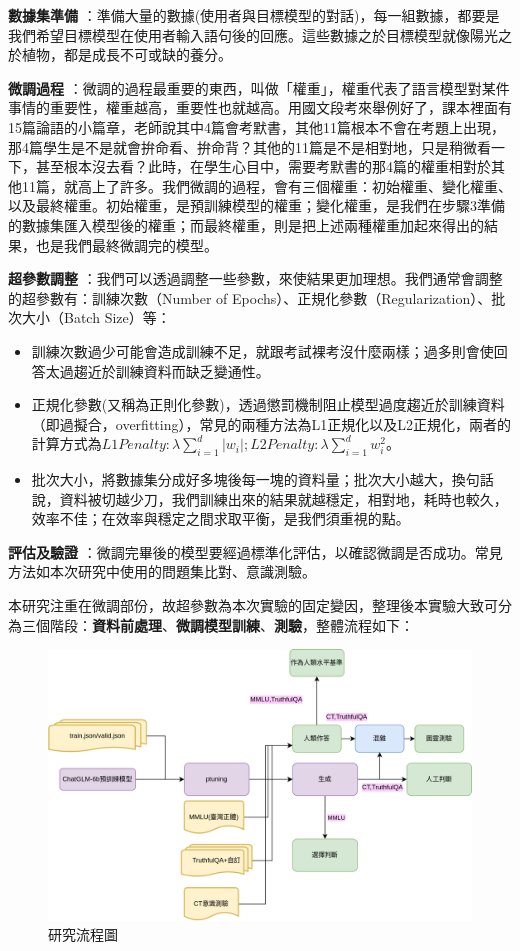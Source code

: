 \documentclass[12pt,a4paper,MingLiU,UTF8,natbib]{article}
\def\xeCJKembold{0.4}
\def\saveCJKnode{\dimen255\lastkern}
\def\restoreCJKnode{\kern-\dimen255\kern\dimen255}
\let\CJKoldsymbol\CJKsymbol
\let\CJKoldpunctsymbol\CJKpunctsymbol
\def\CJKfakeboldsymbol#1{%
	\special{pdf:literal direct 2 Tr \xeCJKembold\space w}%
	\CJKoldsymbol{#1}%
	\saveCJKnode
	\special{pdf:literal direct 0 Tr}%
	\restoreCJKnode}
\def\CJKfakeboldpunctsymbol#1{%
	\special{pdf:literal direct 2 Tr \xeCJKembold\space w}%
	\CJKoldpunctsymbol{#1}%
	\saveCJKnode
	\special{pdf:literal direct 0 Tr}%
	\restoreCJKnode}
\newcommand\CJKfakebold[1]{%
	\let\CJKsymbol\CJKfakeboldsymbol
	\let\CJKpunctsymbol\CJKfakeboldpunctsymbol
	#1%
	\let\CJKsymbol\CJKoldsymbol
	\let\CJKpunctsymbol\CJKoldpunctsymbol}
\begin{document}
	\CJKfakebold{\textbf{數據集準備}}：準備大量的數據(使用者與目標模型的對話)，每一組數據，都要是我們希望目標模型在使用者輸入語句後的回應。這些數據之於目標模型就像陽光之於植物，都是成長不可或缺的養分。
	
	\CJKfakebold{\textbf{微調過程}}：微調的過程最重要的東西，叫做「權重」，權重代表了語言模型對某件事情的重要性，權重越高，重要性也就越高。用國文段考來舉例好了，課本裡面有15篇論語的小篇章，老師說其中4篇會考默書，其他11篇根本不會在考題上出現，那4篇學生是不是就會拚命看、拚命背？其他的11篇是不是相對地，只是稍微看一下，甚至根本沒去看？此時，在學生心目中，需要考默書的那4篇的權重相對於其他11篇，就高上了許多。我們微調的過程，會有三個權重：初始權重、變化權重、以及最終權重。初始權重，是預訓練模型的權重；變化權重，是我們在步驟3準備的數據集匯入模型後的權重；而最終權重，則是把上述兩種權重加起來得出的結果，也是我們最終微調完的模型。
	
	\CJKfakebold{\textbf{超參數調整}}：我們可以透過調整一些參數，來使結果更加理想。我們通常會調整的超參數有：訓練次數（Number of Epochs）、正規化參數（Regularization）、批次大小（Batch Size）等：
	\begin{itemize}
		\item 訓練次數過少可能會造成訓練不足，就跟考試裸考沒什麼兩樣；過多則會使回答太過趨近於訓練資料而缺乏變通性。
		\item 正規化參數(又稱為正則化參數)，透過懲罰機制阻止模型過度趨近於訓練資料（即過擬合，overfitting），常見的兩種方法為L1正規化以及L2正規化，兩者的計算方式為$L1 Penalty:\lambda\sum_{i=1}^{d}|w_i|;L2 Penalty:\lambda\sum_{i=1}^{d}w^2_i$。
		\item 批次大小，將數據集分成好多塊後每一塊的資料量；批次大小越大，換句話說，資料被切越少刀，我們訓練出來的結果就越穩定，相對地，耗時也較久，效率不佳；在效率與穩定之間求取平衡，是我們須重視的點。
	\end{itemize}
	
	\CJKfakebold{\textbf{評估及驗證}}：微調完畢後的模型要經過標準化評估，以確認微調是否成功。常見方法如本次研究中使用的問題集比對、意識測驗。
	
	本研究注重在微調部份，故超參數為本次實驗的固定變因，整理後本實驗大致可分為三個階段：\textbf{資料前處理}、\textbf{微調模型訓練}、\textbf{測驗}，整體流程如下：
	
	\begin{figure}[H]
		\centering
	\includegraphics[width=\textwidth]{flowofstudy}
	\caption{研究流程圖}
	\end{figure}
	
\end{document}
